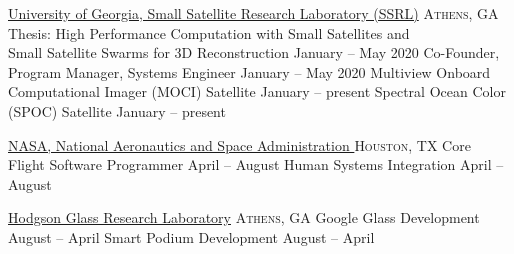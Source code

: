 \documentclass[10pt,a4paper]{article}
\begin{document}
\headedsection  %
  {\href{http://smallsat.uga.edu}{University of Georgia, Small Satellite Research Laboratory (SSRL)}}
  {\textsc{Athens, GA}} {%
  \headedsubsection
    {Thesis: High Performance Computation with Small Satellites and \\Small Satellite Swarms for 3D Reconstruction}
    {January  -- May 2020}
    {}
  \headedsubsection
    {Co-Founder, Program Manager, Systems Engineer}
    {January  -- May 2020}
    {}
  \headedsubsection
    {Multiview Onboard Computational Imager (MOCI) Satellite}
    {January  -- present}
    {}
  \headedsubsection
    {Spectral Ocean Color (SPOC) Satellite}
    {January  -- present}
    {}
}

\headedsection  %
  {\href{http://nasa.gov}{NASA, National Aeronautics and Space Administration }}
  {\textsc{Houston, TX}} {%
  \headedsubsection
    {Core Flight Software Programmer}
    {April  -- August }
    {}
  \headedsubsection
    {Human Systems Integration}
    {April  -- August }
    {}
}

\headedsection  %
  {\href{https://web.archive.org/web/20160415174833/http://glass.music.uga.edu:80/}{Hodgson Glass Research Laboratory}}
  {\textsc{Athens, GA}} {%
   \headedsubsection
    {Google Glass Development}
    {August  -- April }
    {}
  \headedsubsection
    {Smart Podium Development}
    {August  -- April }
    {}
}
\end{document}
